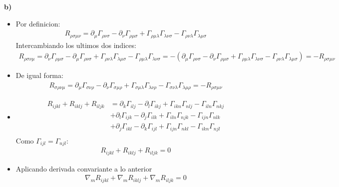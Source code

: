 \documentclass{article}
\begin{document}
\textbf{b) }
\begin{itemize}
  \item Por definicion: 
    \begin{gather*}
      R_{\rho\sigma\mu\nu} = \partial_\mu \Gamma_{\rho\nu\sigma} - \partial_\nu \Gamma_{\rho\mu\sigma} + \Gamma_{\rho\mu\lambda} \Gamma_{\lambda\nu\sigma} - \Gamma_{\rho\nu\lambda} \Gamma_{\lambda\mu\sigma} 
    \end{gather*}
    Intercambiando los ultimos dos indices: 
    \begin{gather*}
      R_{\rho\sigma\nu\mu} = \partial_\nu \Gamma_{\rho\mu\sigma} - \partial_\mu \Gamma_{\rho\nu\sigma} + \Gamma_{\rho\nu\lambda} \Gamma_{\lambda\mu\sigma} - \Gamma_{\rho\mu\lambda} \Gamma_{\lambda\nu\sigma} =  -(\partial_\mu \Gamma_{\rho\nu\sigma} - \partial_\nu \Gamma_{\rho\mu\sigma} + \Gamma_{\rho\mu\lambda} \Gamma_{\lambda\nu\sigma} - \Gamma_{\rho\nu\lambda} \Gamma_{\lambda\mu\sigma}) = - R_{\rho\sigma\mu\nu}
    \end{gather*}
  \item De igual forma: 
    \begin{gather*}
      R _{\sigma\rho\nu\mu} =  \partial_\mu \Gamma_{\sigma\nu\rho} - \partial_\nu \Gamma_{\sigma\mu\rho} + \Gamma_{\sigma\mu\lambda} \Gamma_{\lambda\nu\rho} - \Gamma_{\sigma\nu\lambda} \Gamma_{\lambda\mu\rho} = - R_{\rho\sigma\mu\nu}
    \end{gather*}
  \item 
    \begin{align*}
      R _{ijkl} + R _{iklj} + R_{iljk} &= \partial_k \Gamma_{ilj} - \partial_l \Gamma_{ikj} + \Gamma_{ikn} \Gamma_{nlj} - \Gamma_{iln} \Gamma_{nkj}
      \\&+ \partial_l \Gamma_{ijk} - \partial_j \Gamma_{ilk} + \Gamma_{iln} \Gamma_{njk} - \Gamma_{ijn} \Gamma_{nlk}
      \\&+ \partial_j \Gamma_{ikl} - \partial_k \Gamma_{ijl} + \Gamma_{ijn} \Gamma_{nkl} - \Gamma_{ikn} \Gamma_{njl} \\
    \end{align*}
    Como $ \Gamma _{ijl} = \Gamma_{njl }  $: 
    \begin{gather*}
      R _{ijkl} + R _{iklj} + R_{iljk} = 0
    \end{gather*}
  \item Aplicando derivada convariante a lo anterior
    \begin{gather*}
      \nabla_m R _{ijkl} +\nabla_m  R _{iklj} +\nabla_m  R_{iljk} = 0
    \end{gather*}

\end{itemize}
\end{document}
